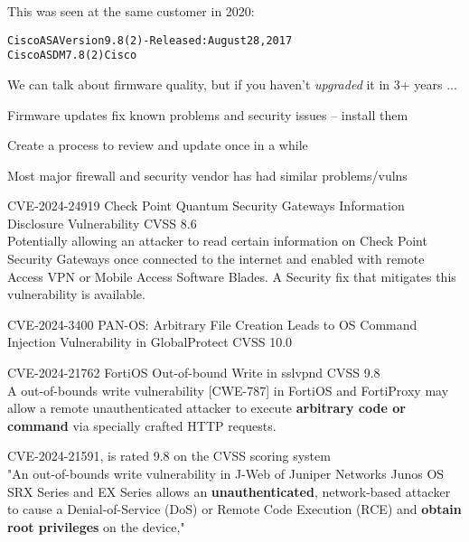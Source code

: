 \documentclass[Screen16to9,17pt]{foils}
\begin{document}


This was seen at the same customer in 2020:
\begin{alltt}
Cisco ASA Version 9.8(2) - Released: August 28, 2017
Cisco ASDM 7.8(2)Cisco
\end{alltt}

\begin{list2}
\item We can talk about firmware quality, but if you haven't \emph{upgraded} it in 3+ years ...
\item Firmware updates fix known problems and security issues -- install them
\item Create a process to review and update once in a while
\end{list2}


Most major firewall and security vendor has had similar problems/vulns
\begin{list2}
\item CVE-2024-24919 Check Point Quantum Security Gateways Information Disclosure Vulnerability CVSS 8.6\\
Potentially allowing an attacker to read certain information on Check Point Security Gateways once connected to the internet and enabled with remote Access VPN or Mobile Access Software Blades. A Security fix that mitigates this vulnerability is available.

\item CVE-2024-3400 PAN-OS: Arbitrary File Creation Leads to OS Command Injection Vulnerability in GlobalProtect CVSS 10.0
\item CVE-2024-21762 FortiOS Out-of-bound Write in sslvpnd CVSS 9.8\\
    A out-of-bounds write vulnerability [CWE-787] in FortiOS and FortiProxy may allow a remote unauthenticated attacker to execute {\bf arbitrary code or command} via specially crafted HTTP requests.
\item CVE-2024-21591, is rated 9.8 on the CVSS scoring system\\
"An out-of-bounds write vulnerability in J-Web of Juniper Networks Junos OS SRX Series and EX Series allows an {\bf unauthenticated}, network-based attacker to cause a Denial-of-Service (DoS) or Remote Code Execution (RCE) and {\bf obtain root privileges} on the device,"
\end{list2}
\end{document}
